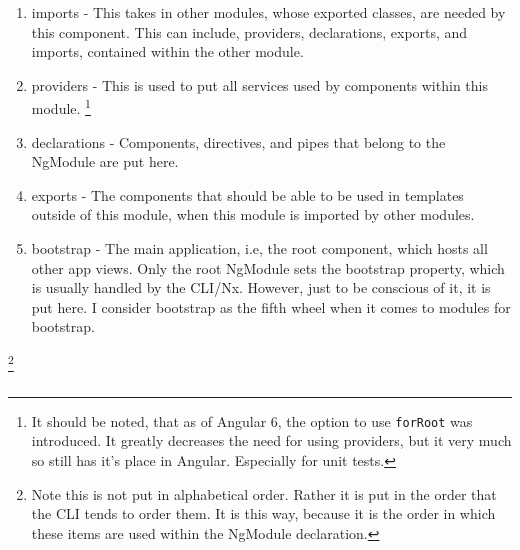\begin{enumerate}
  \item imports - This takes in other modules, whose exported classes, are
  needed by this component. This can include, providers, declarations, exports,
  and imports, contained within the other module.
  \item providers - This is used to put all services used by components within
  this module. \footnote{It should be noted, that as of Angular 6, the option
  to use \lstinline{forRoot} was introduced. It greatly decreases the need for
  using providers, but it very much so still has it's place in Angular.
  Especially for unit tests.}
  \item declarations - Components, directives, and pipes that belong to the
  NgModule are put here.
  \item exports - The components that should be able to be used in templates
  outside of this module, when this module is imported by other modules.
  \item bootstrap - The main application, i.e, the root component, which hosts
  all other app views. Only the root NgModule sets the bootstrap property,
  which is usually handled by the CLI/Nx. However, just to be conscious of it,
  it is put here. I consider bootstrap as the fifth wheel when it comes to
  modules for bootstrap.
\end{enumerate}
\footnote{Note this is not put in alphabetical order. Rather it is put in the
order that the CLI tends to order them. It is this way, because it is the order
in which these items are used within the NgModule declaration.}

\subsection{}
